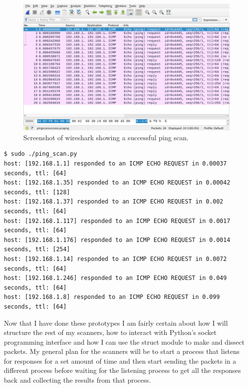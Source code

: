 \documentclass[titlepage]{article}
\begin{document}
\begin{figure}[H]
  \centering
  \includegraphics[width=\textwidth]{pingscan.png}
  \caption{%
    Screenshot of wireshark showing a successful ping scan.
  }\label{pingscansuccess}
\end{figure}

\lstset{language=C}
\begin{lstlisting}[label=pingscanout,caption=The output of from the ping scanner on the run which generated the \gls{pcap} file in figure~\ref{pingscansuccess}]
$ sudo ./ping_scan.py
host: [192.168.1.1]	responded to an ICMP ECHO REQUEST in 0.00037    seconds, ttl: [64]
host: [192.168.1.35] responded to an ICMP ECHO REQUEST in 0.00042    seconds, ttl: [128]
host: [192.168.1.37] responded to an ICMP ECHO REQUEST in 0.002      seconds, ttl: [64]
host: [192.168.1.117] responded to an ICMP ECHO REQUEST in 0.0017     seconds, ttl: [64]
host: [192.168.1.176] responded to an ICMP ECHO REQUEST in 0.0014     seconds, ttl: [254]
host: [192.168.1.14] responded to an ICMP ECHO REQUEST in 0.0072     seconds, ttl: [64]
host: [192.168.1.246] responded to an ICMP ECHO REQUEST in 0.049      seconds, ttl: [64]
host: [192.168.1.8] responded to an ICMP ECHO REQUEST in 0.099      seconds, ttl: [64]
\end{lstlisting}

Now that I have done these prototypes I am fairly certain about how I will structure the rest of
my scanners, how to interact with Python's socket programming interface and how I can use the
struct module to make and dissect packets. My general plan for the scanners will be to start
a process that listens for responses for a set amount of time and then start sending the packets
in a different process before waiting for the listening process to get all the responses back and
collecting the results from that process.
\end{document}
